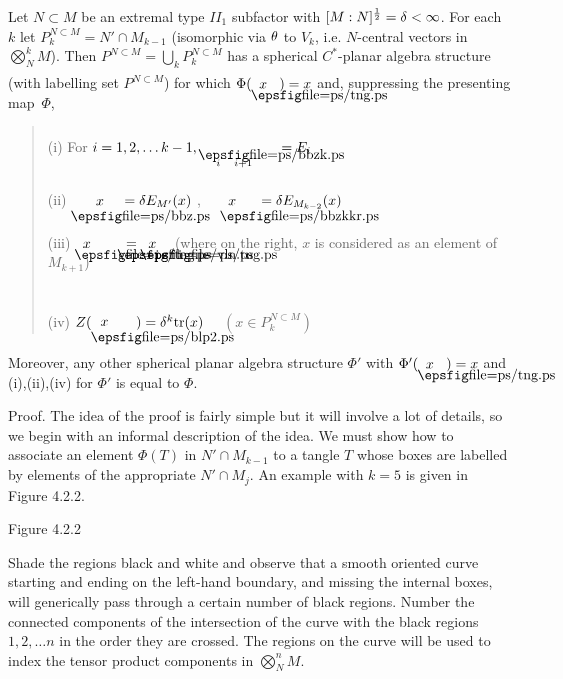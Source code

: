  Let $N\subset M$ be an extremal type
$II_1$ subfactor with $[M:N]^{\frac 12}=\delta <\infty$. For each $k$ let
$P^{N\subset M}_k=N'\cap M_{k-1}$ (isomorphic via $\theta$ to $V_k$,
i.e.
$N$-central vectors in $\bigotimes^k_N M$). Then
$P^{N\subset M}=\bigcup_k P^{N\subset M}_k$ has a
spherical
$C^*$-planar algebra structure (with labelling set $P^{N\subset
M}$) for which
$\Phi(\tangle{x})=x$ and, suppressing the
presenting map~$\Phi$,
\begin{verse}
(i) For $i=1,2,\dots k-1,\boxj = E_i$ \bs

(ii) $\boxh{x} = \d E_{M'}(x)$ , \ \
 $\boxl{x} \ = \d E_{M_{k-2}}(x)$ \bs

(iii) $\tangle{x}\ \  \vln = \tangle{x}$ 
(where on the right, $x$ is considered as an element of $M_{k+1}$)
\bs

(iv) $Z(\boxrloop{x})=\d^k {\op{tr}}(x)$ \ \
$(x\in P^{N\subset M}_k)$
\end{verse}
\bs
Moreover, any other spherical planar algebra structure $\Phi'$ with
$\Phi'(\tangle{x})=x$ and {\rm (i),(ii),(iv)} for
$\Phi'$ is equal to $\Phi$.

\bigskip
{\sc Proof.}  The idea of the proof is fairly simple but it will
involve a lot of details, so we begin with an informal description
of the idea. We must show how to associate an element $\Phi(T)$ in
$N'\cap M_{k-1}$ to a tangle $T$  whose boxes are labelled by
elements of the appropriate $N'\cap M_j$. An example with $k=5$ is
given in Figure 4.2.2.
\[
	
\]
\begin{center}
Figure 4.2.2
\end{center}
\bs Shade the regions black and white and observe that a smooth
oriented curve starting and ending on the left-hand boundary, and
missing the internal boxes, will generically pass through a
certain number of black regions. Number the connected components of
the intersection of the curve with the black
 regions $1,2,\dots
n$ in the order they are crossed.
The regions on the curve will be used to index the tensor product
components in
$\bigotimes^n_N M$.

